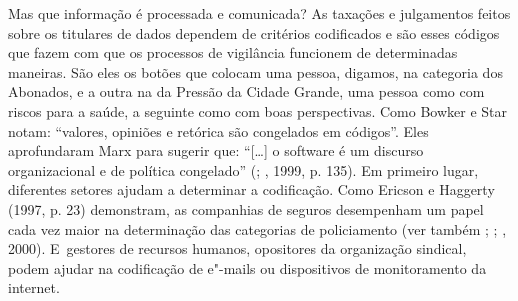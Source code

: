 Mas que informação é processada e comunicada? As taxações e julgamentos
feitos sobre os titulares de dados dependem de critérios codificados e
são esses códigos que fazem com que os processos de vigilância funcionem
de determinadas maneiras. São eles os botões que colocam uma pessoa,
digamos, na categoria dos Abonados, e a outra na da Pressão da Cidade
Grande, uma pessoa como com riscos para a saúde, a seguinte como com
boas perspectivas. Como Bowker e Star notam: ``valores, opiniões e
retórica são congelados em códigos''. Eles aprofundaram Marx para
sugerir que: ``{[}\ldots{}{]} o software é um discurso organizacional e
de política congelado'' (; , 1999, p. 135). Em primeiro lugar,
diferentes setores ajudam a determinar a codificação. Como Ericson e
Haggerty (1997, p. 23) demonstram, as companhias de seguros desempenham
um papel cada vez maior na determinação das categorias de policiamento
(ver também ; ; , 2000). E~gestores de recursos
humanos, opositores da organização sindical, podem ajudar na codificação
de e"-mails ou dispositivos de monitoramento da internet.

